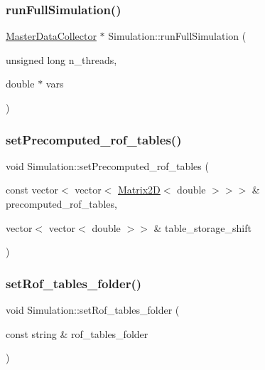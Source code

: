 \subsubsection{\texorpdfstring{run\+Full\+Simulation()}{runFullSimulation()}}
{\footnotesize\ttfamily \mbox{\hyperlink{classMasterDataCollector}{Master\+Data\+Collector}} $\ast$ Simulation\+::run\+Full\+Simulation (\begin{DoxyParamCaption}\item[{unsigned long}]{n\+\_\+threads,  }\item[{double $\ast$}]{vars }\end{DoxyParamCaption})}

\mbox{\label{classSimulation_ac82ef64c2eccf84c9a623e066d135914_ac82ef64c2eccf84c9a623e066d135914}} 
\subsubsection{\texorpdfstring{set\+Precomputed\+\_\+rof\+\_\+tables()}{setPrecomputed\_rof\_tables()}}
{\footnotesize\ttfamily void Simulation\+::set\+Precomputed\+\_\+rof\+\_\+tables (\begin{DoxyParamCaption}\item[{const vector$<$ vector$<$ \mbox{\hyperlink{classMatrix2D}{Matrix2D}}$<$ double $>$$>$$>$ \&}]{precomputed\+\_\+rof\+\_\+tables,  }\item[{vector$<$ vector$<$ double $>$$>$ \&}]{table\+\_\+storage\+\_\+shift }\end{DoxyParamCaption})\hspace{0.3cm}{\ttfamily [private]}}

\mbox{\label{classSimulation_a0f01e328435fab79c18ccdda28617bae_a0f01e328435fab79c18ccdda28617bae}} 
\subsubsection{\texorpdfstring{set\+Rof\+\_\+tables\+\_\+folder()}{setRof\_tables\_folder()}}
{\footnotesize\ttfamily void Simulation\+::set\+Rof\+\_\+tables\+\_\+folder (\begin{DoxyParamCaption}\item[{const string \&}]{rof\+\_\+tables\+\_\+folder }\end{DoxyParamCaption})\hspace{0.3cm}{\ttfamily [private]}}

